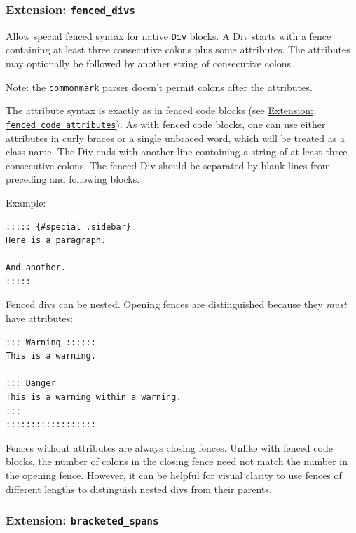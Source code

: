 \documentclass[
]{article}
\begin{document}
\hypertarget{extension-fenced_divs}{%
\subsubsection{\texorpdfstring{Extension:
\texttt{fenced\_divs}}{Extension: fenced\_divs}}\label{extension-fenced_divs}}

Allow special fenced syntax for native \texttt{Div} blocks. A Div starts
with a fence containing at least three consecutive colons plus some
attributes. The attributes may optionally be followed by another string
of consecutive colons.

Note: the \texttt{commonmark} parser doesn't permit colons after the
attributes.

The attribute syntax is exactly as in fenced code blocks (see
\protect\hyperlink{extension-fenced_code_attributes}{Extension:
\texttt{fenced\_code\_attributes}}). As with fenced code blocks, one can
use either attributes in curly braces or a single unbraced word, which
will be treated as a class name. The Div ends with another line
containing a string of at least three consecutive colons. The fenced Div
should be separated by blank lines from preceding and following blocks.

Example:

\begin{verbatim}
::::: {#special .sidebar}
Here is a paragraph.

And another.
:::::
\end{verbatim}

Fenced divs can be nested. Opening fences are distinguished because they
\emph{must} have attributes:

\begin{verbatim}
::: Warning ::::::
This is a warning.

::: Danger
This is a warning within a warning.
:::
::::::::::::::::::
\end{verbatim}

Fences without attributes are always closing fences. Unlike with fenced
code blocks, the number of colons in the closing fence need not match
the number in the opening fence. However, it can be helpful for visual
clarity to use fences of different lengths to distinguish nested divs
from their parents.

\hypertarget{extension-bracketed_spans}{%
\subsubsection{\texorpdfstring{Extension:
\texttt{bracketed\_spans}}{Extension: bracketed\_spans}}\label{extension-bracketed_spans}}
\end{document}
